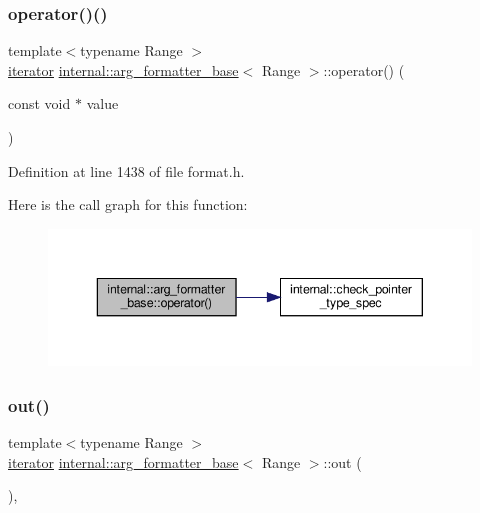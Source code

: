 \subsubsection{\texorpdfstring{operator()()}{operator()()}\hspace{0.1cm}{\footnotesize\ttfamily [6/6]}}
{\footnotesize\ttfamily template$<$typename Range $>$ \\
\hyperlink{classinternal_1_1arg__formatter__base_a87622fdc9716fee6a6de2ae496e3a54f}{iterator} \hyperlink{classinternal_1_1arg__formatter__base}{internal\+::arg\+\_\+formatter\+\_\+base}$<$ Range $>$\+::operator() (\begin{DoxyParamCaption}\item[{const void $\ast$}]{value }\end{DoxyParamCaption})\hspace{0.3cm}{\ttfamily [inline]}}



Definition at line 1438 of file format.\+h.

Here is the call graph for this function\+:
\nopagebreak
\begin{figure}[H]
\begin{center}
\leavevmode
\includegraphics[width=343pt]{classinternal_1_1arg__formatter__base_a77a4267b70ae9bd069e6134a7b2af862_cgraph}
\end{center}
\end{figure}
\mbox{\label{classinternal_1_1arg__formatter__base_a01c4577755b7ce197ce0da3a94b5fc82}} 
\subsubsection{\texorpdfstring{out()}{out()}}
{\footnotesize\ttfamily template$<$typename Range $>$ \\
\hyperlink{classinternal_1_1arg__formatter__base_a87622fdc9716fee6a6de2ae496e3a54f}{iterator} \hyperlink{classinternal_1_1arg__formatter__base}{internal\+::arg\+\_\+formatter\+\_\+base}$<$ Range $>$\+::out (\begin{DoxyParamCaption}{ }\end{DoxyParamCaption})\hspace{0.3cm}{\ttfamily [inline]}, {\ttfamily [protected]}}



